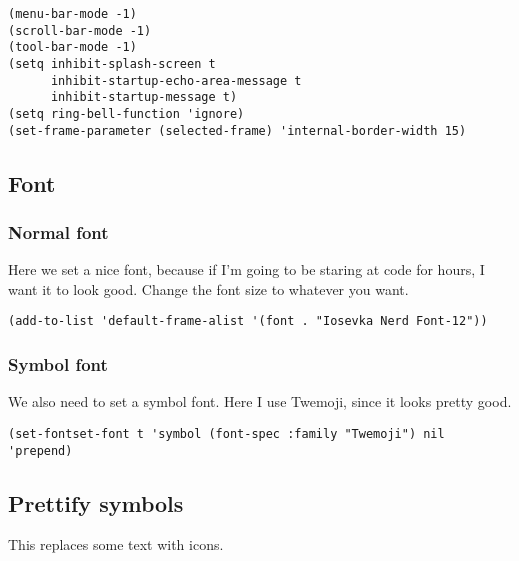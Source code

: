 \documentclass[11pt]{article}
\begin{document}
\begin{verbatim}
(menu-bar-mode -1)
(scroll-bar-mode -1)
(tool-bar-mode -1)
(setq inhibit-splash-screen t
      inhibit-startup-echo-area-message t
      inhibit-startup-message t)
(setq ring-bell-function 'ignore)
(set-frame-parameter (selected-frame) 'internal-border-width 15)
\end{verbatim}

\subsection*{Font}
\label{sec:orga3fedee}

\subsubsection*{Normal font}
\label{sec:orgded0a6c}

Here we set a nice font, because if I'm going to be staring at code for hours, I want it to look good. Change the font size to whatever you want.

\begin{verbatim}
(add-to-list 'default-frame-alist '(font . "Iosevka Nerd Font-12"))
\end{verbatim}

\subsubsection*{Symbol font}
\label{sec:org37c03b4}

We also need to set a symbol font. Here I use Twemoji, since it looks pretty good.

\begin{verbatim}
(set-fontset-font t 'symbol (font-spec :family "Twemoji") nil 'prepend)
\end{verbatim}

\subsection*{Prettify symbols}
\label{sec:orgc65e209}

This replaces some text with icons.
\end{document}
